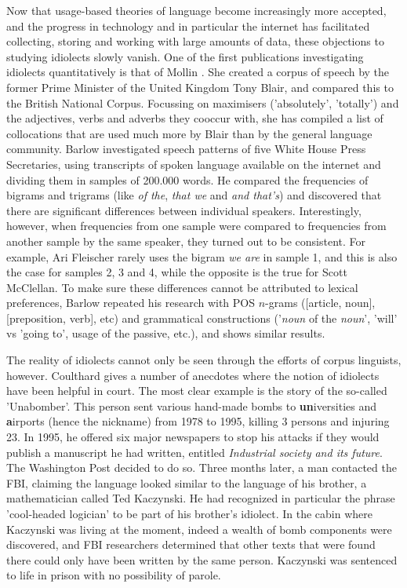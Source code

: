 \documentclass[11pt]{article}
\begin{document}
Now that usage-based theories of language become increasingly more accepted, and the progress in technology and in particular the internet has facilitated collecting, storing and working with large amounts of data, these objections to studying idiolects slowly vanish. One of the first publications investigating idiolects quantitatively is that of Mollin . She created a corpus of speech by the former Prime Minister of the United Kingdom Tony Blair, and compared this to the British National Corpus. Focussing on maximisers ('absolutely', 'totally') and the adjectives, verbs and adverbs they cooccur with, she has compiled a list of collocations that are used much more by Blair than by the general language community. Barlow  investigated speech patterns of five White House Press Secretaries, using transcripts of spoken language available on the internet and dividing them in samples of 200.000 words. He compared the frequencies of bigrams and trigrams (like \emph{of the}, \emph{that we} and \emph{and that's}) and discovered that there are significant differences between individual speakers. Interestingly, however, when frequencies from one sample were compared to frequencies from another sample by the same speaker, they turned out to be consistent. For example, Ari Fleischer rarely uses the bigram \emph{we are} in sample 1, and this is also the case for samples 2, 3 and 4, while the opposite is the true for Scott McClellan. To make sure these differences cannot be attributed to lexical preferences, Barlow repeated his research with POS $n$-grams ([article, noun], [preposition, verb], etc) and grammatical constructions ('\emph{noun} of the \emph{noun}',  'will' vs 'going to', usage of the passive, etc.), and shows similar results.

The reality of idiolects cannot only be seen through the efforts of corpus linguists, however. Coulthard  gives a number of anecdotes where the notion of idiolects have been helpful in court. The most clear example is the story of the so-called 'Unabomber'. This person sent various hand-made bombs to \textbf{un}iversities and \textbf{a}irports (hence the nickname) from 1978 to 1995, killing 3 persons and injuring 23. In 1995, he offered six major newspapers to stop his attacks if they would publish a manuscript he had written, entitled \emph{Industrial society and its future}. The Washington Post decided to do so. Three months later, a man contacted the FBI, claiming the language looked similar to the language of his brother, a mathematician called Ted Kaczynski. He had recognized in particular the phrase 'cool-headed logician' to be part of his brother's idiolect. In the cabin where Kaczynski was living at the moment, indeed a wealth of bomb components were discovered, and FBI researchers determined that other texts that were found there could only have been written by the same person. Kaczynski was sentenced to life in prison with no possibility of parole. 
\end{document}
